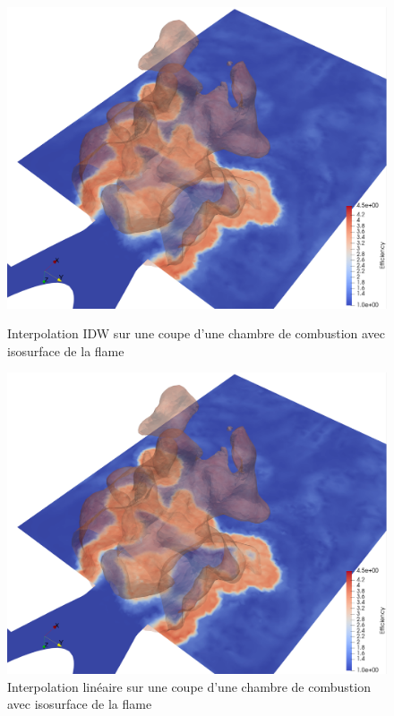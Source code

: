 \begin{figure}[H]
    \centering
    \begin{minipage}[b]{0.47\textwidth}
        \centering
        \includegraphics[width=\textwidth]{images/cb-IDW.png}
        \caption{Interpolation IDW sur une coupe d'une chambre de combustion avec isosurface de la flame}
        \label{fig:cb-IDW}
    \end{minipage}
    \hspace{0.02\textwidth} %
    \begin{minipage}[b]{0.47\textwidth}
        \centering
        \includegraphics[width=\textwidth]{images/cb-lineaire.png}
        \caption{Interpolation linéaire sur une coupe d'une chambre de combustion avec isosurface de la flame}
        \label{fig:cb-lineaire}
    \end{minipage}
\end{figure}



